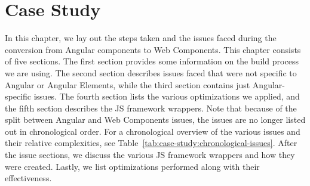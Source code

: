 \chapter{Case Study}\label{chap:case-study}

In this chapter, we lay out the steps taken and the issues faced during the conversion from Angular components to Web Components. This chapter consists of five sections. The first section provides some information on the build process we are using. The second section describes issues faced that were not specific to Angular or Angular Elements, while the third section contains just Angular-specific issues. The fourth section lists the various optimizations we applied, and the fifth section describes the JS framework wrappers. Note that because of the split between Angular and Web Components issues, the issues are no longer listed out in chronological order. For a chronological overview of the various issues and their relative complexities, see Table~\ref{tab:case-study:chronological-issues}. After the issue sections, we discuss the various JS framework wrappers and how they were created. Lastly, we list optimizations performed along with their effectiveness.

